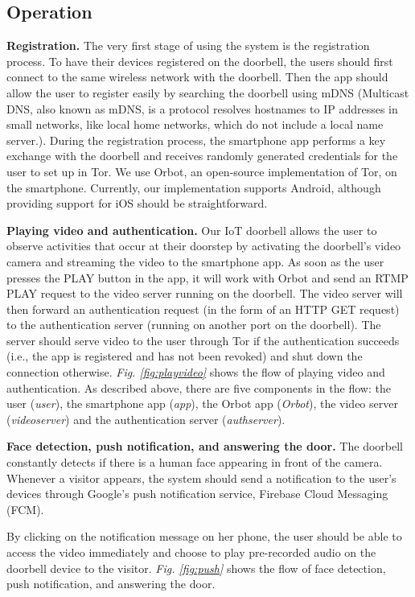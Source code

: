 \subsection{Operation}

\textbf{Registration.} The very first stage of using the system is the registration process. To have their devices registered on the doorbell, the users should first connect to the same wireless network with the doorbell. Then the app should allow the user to register easily by searching the doorbell using mDNS (Multicast DNS, also known as mDNS, is a protocol resolves hostnames to IP addresses in small networks, like local home networks, which do not include a local name server.). During the registration process, the smartphone app performs a key exchange with the doorbell and receives randomly generated credentials for the user to set up in Tor. We use Orbot, an open-source implementation of Tor, on the smartphone. Currently, our implementation supports Android, although providing support for iOS should be straightforward.

\textbf{Playing video and authentication.} Our IoT doorbell allows the user to observe activities that occur at their doorstep by activating the doorbell's video camera and streaming the video to the smartphone app. As soon as the user presses the PLAY button in the app, it will work with Orbot and send an RTMP PLAY request to the video server running on the doorbell. The video server will then forward an authentication request (in the form of an HTTP GET request) to the authentication server (running on another port on the doorbell). The server should serve video to the user through Tor if the authentication succeeds (i.e., the app is registered and has not been revoked) and shut down the connection otherwise.
\textit{Fig. \ref{fig:playvideo}} shows the flow of playing video and authentication. As described above, there are five components in the flow: the user (\textit{user}), the smartphone app (\textit{app}), the Orbot app (\textit{Orbot}), the video server (\textit{videoserver}) and the authentication server (\textit{authserver}).

\textbf{Face detection, push notification, and answering the door.} The doorbell constantly detects if there is a human face appearing in front of the camera. Whenever a visitor appears, the system should send a notification to the user's devices through Google's push notification service, Firebase Cloud Messaging (FCM).

By clicking on the notification message on her phone, the user should be able to access the video immediately and choose to play pre-recorded audio on the doorbell device to the visitor.
\textit{Fig. \ref{fig:push}} shows the flow of face detection, push notification, and answering the door.


